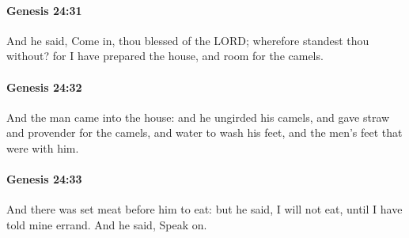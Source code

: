 		\paragraph{Genesis 24:31} %
			\label{GENESIS-24-31}

			And he said, Come in, thou blessed of the LORD; wherefore standest thou without?  for I have prepared the house, and room for the camels.


		\paragraph{Genesis 24:32} %
			\label{GENESIS-24-32}

			And the man came into the house: and he ungirded his camels, and gave straw and provender for the camels, and water to wash his feet, and the men's feet that were with him.


		\paragraph{Genesis 24:33} %
			\label{GENESIS-24-33}

			And there was set meat before him to eat: but he said, I will not eat, until I have told mine errand.  And he said, Speak on.


